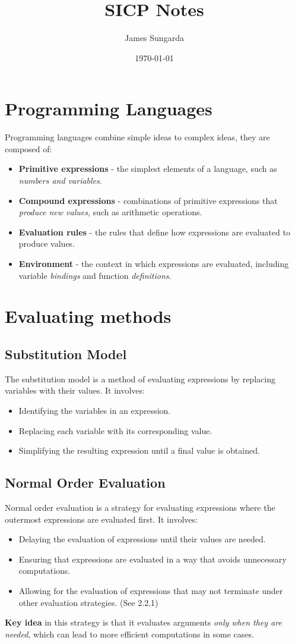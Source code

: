 \documentclass{notes}
\begin{document}
\title{SICP Notes}
\author{James Sungarda}
\date{\today}
\maketitle

\section{Programming Languages}
Programming languages combine simple ideas to complex ideas, they are composed of:
\begin{itemize}
    \item \textbf{Primitive expressions} - the simplest elements of a language, such as \emph{numbers and variables}.
    \item \textbf{Compound expressions} - combinations of primitive expressions that \emph{produce new values}, such as arithmetic operations.
    \item \textbf{Evaluation rules} - the rules that define how expressions are evaluated to produce values.
    \item \textbf{Environment} - the context in which expressions are evaluated, including variable \emph{bindings} and function \emph{definitions}.
\end{itemize}

\section{Evaluating methods}
\subsection{Substitution Model}
The substitution model is a method of evaluating expressions by replacing variables with their values. It involves:
\begin{itemize}
    \item Identifying the variables in an expression.
    \item Replacing each variable with its corresponding value.
    \item Simplifying the resulting expression until a final value is obtained.
\end{itemize}

\subsection{Normal Order Evaluation}
Normal order evaluation is a strategy for evaluating expressions where the outermost expressions are evaluated first. It involves:
\begin{itemize}
    \item Delaying the evaluation of expressions until their values are needed.
    \item Ensuring that expressions are evaluated in a way that avoids unnecessary computations.
    \item Allowing for the evaluation of expressions that may not terminate under other evaluation strategies. (See 2.2.1)
\end{itemize}
\textbf{Key idea} in this strategy is that it evaluates arguments \emph{only when they are needed}, which can lead to more efficient computations in some cases.
\end{document}
